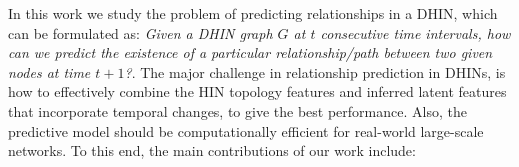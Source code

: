 In this work we study the problem of predicting relationships in a DHIN, which can be formulated as: \textit{Given a DHIN graph $G$ at $t$ consecutive time intervals, how can we predict the existence of a particular relationship/path between two given nodes at time $t+1$?}. The major challenge in relationship prediction in DHINs, is how to effectively combine the HIN topology features and inferred latent features that incorporate temporal changes, to give the best performance. Also, the predictive model should be computationally efficient for real-world large-scale networks. To this end, the main contributions of our work include:












